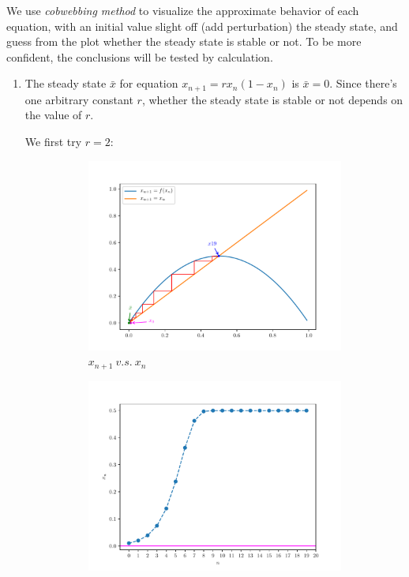 \begin{homeworkProblem}[2]
We use \textit{cobwebbing method} to visualize the approximate behavior of each
equation, with an initial value slight off (add perturbation) the steady state,
and guess from the plot whether the steady state is stable or not. To be more
confident, the conclusions will be tested by calculation.

\begin{enumerate}
\item The steady state $\bar x$ for equation $x_{n+1} = rx_n(1-x_n)$ is
$\bar x = 0$. Since there's one arbitrary constant $r$, whether the steady
state is stable or not depends on the value of $r$.

We first try $r=2$:
\begin{figure}[h]
    \centering
    \begin{subfigure}[t]{0.4\linewidth}
        \centering
        \includegraphics[scale=0.5]{fig/fig2(a)(1)_cob.pdf}
        \caption{$x_{n+1}\ v.s.\ x_n$}
    \end{subfigure}
    \hfill
    \begin{subfigure}[t]{0.4\linewidth}
        \centering
        \includegraphics[scale=0.5]{../fig/fig2(a)(1).pdf}

\end{subfigure}
\end{figure}
\end{enumerate}
\end{homeworkProblem}
